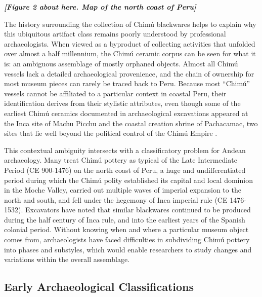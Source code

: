 \documentclass[]{interact}
\theoremstyle{plain}%
\theoremstyle{definition}
\theoremstyle{remark}
\begin{document}
\emph{\textbf{{[}Figure 2 about here. Map of the north coast of
Peru{]}}}

The history surrounding the collection of Chimú blackwares helps to
explain why this ubiquitous artifact class remains poorly understood by
professional archaeologists. When viewed as a byproduct of collecting
activities that unfolded over almost a half millennium, the Chimú
ceramic corpus can be seen for what it is: an ambiguous assemblage of
mostly orphaned objects. Almost all Chimú vessels lack a detailed
archaeological provenience, and the chain of ownership for most museum
pieces can rarely be traced back to Peru. Because most ``Chimú'' vessels
cannot be affiliated to a particular context in coastal Peru, their
identification derives from their stylistic attributes, even though some
of the earliest Chimú ceramics documented in archaeological excavations
appeared at the Inca site of Machu Picchu \citep[269]{RN7063} and the
coastal creation shrine of Pachacamac, two sites that lie well beyond
the political control of the Chimú Empire \citep[756]{RN11154}.

This contextual ambiguity intersects with a classificatory problem for
Andean archaeology. Many treat Chimú pottery as typical of the Late
Intermediate Period (CE 900-1476) on the north coast of Peru, a huge and
undifferentiated period during which the Chimú polity established its
capital and local dominion in the Moche Valley, carried out multiple
waves of imperial expansion to the north and south, and fell under the
hegemony of Inca imperial rule (CE 1476-1532). Excavators have noted
that similar blackwares continued to be produced during the half century
of Inca rule, and into the earliest years of the Spanish colonial
period. Without knowing when and where a particular museum object comes
from, archaeologists have faced difficulties in subdividing Chimú
pottery into phases and substyles, which would enable researchers to
study changes and variations within the overall assemblage.

\hypertarget{early-archaeological-classifications}{%
\subsection{Early Archaeological
Classifications}\label{early-archaeological-classifications}}
\end{document}
